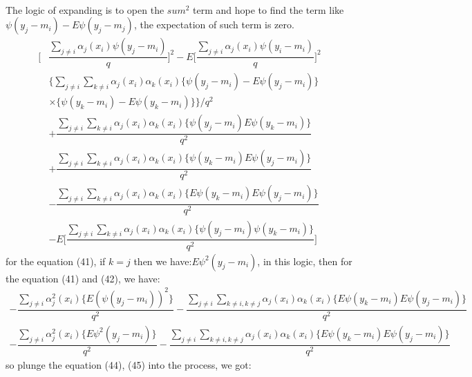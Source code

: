 \documentclass[12pt]{amsart}
\begin{document}
\\
The logic of expanding is to open the $sum^2$ term and hope to find the term like $\psi(y_{j}-m_{i})-E\psi(y_{j}-m_{j})$, the expectation of such term is zero.
\begin{align}
\bigg[&\dfrac{\sum_{j\neq i}\alpha_{j}(x_{i})\psi(y_{j}-m_{i})}{q}\bigg]^{2}-E\bigg[\dfrac{\sum_{j\neq i}\alpha_{j}(x_{i})\psi(y_{i}-m_{i})}{q}\bigg]^{2}\nonumber\\
&\bigg \{\sum_{j\neq i} \sum_{k\neq i}\alpha_{j}(x_{i})\alpha_{k}(x_{i})\{\psi(y_{j}-m_{i})-E\psi(y_{j}-m_{i})\}\nonumber\\
&\times\{\psi(y_{k}-m_{i})-E\psi(y_{k}-m_{i})\}\bigg \}\bigg/q^{2}\\
&+\dfrac{\sum_{j\neq i} \sum_{k\neq i}\alpha_{j}(x_{i})\alpha_{k}(x_{i})\{\psi(y_{j}-m_{i})E\psi(y_{k}-m_{i})\}}{q^2}\nonumber\\
&+\dfrac{\sum_{j\neq i} \sum_{k\neq i}\alpha_{j}(x_{i})\alpha_{k}(x_{i})\{\psi(y_{k}-m_{i})E\psi(y_{j}-m_{i})\}}{q^2}\nonumber\\
&-\dfrac{\sum_{j\neq i} \sum_{k\neq i}\alpha_{j}(x_{i})\alpha_{k}(x_{i})\{E\psi(y_{k}-m_{i})E\psi(y_{j}-m_{i})\}}{q^2}\nonumber\\
&-E\bigg[\dfrac{\sum_{j\neq i} \sum_{k\neq i}\alpha_{j}(x_{i})\alpha_{k}(x_{i})\{\psi(y_{j}-m_{i}) \psi(y_{k}-m_{i})\}}{q^2}\bigg]
\end{align}
for the equation (41), if $k=j$ then we have:$E\psi^{2}(y_{j}-m_{i})$, in this logic, then for the equation (41) and (42), we have:
\begin{align}
-\dfrac{\sum_{j\neq i} \alpha^{2}_{j}(x_{i})\{E(\psi(y_{j}-m_{i}))^{2}\}}{q^2}-\dfrac{\sum_{j\neq i} \sum_{k\neq i,k\neq j}\alpha_{j}(x_{i})\alpha_{k}(x_{i})\{E\psi(y_{k}-m_{i})E\psi(y_{j}-m_{i})\}}{q^2}\nonumber\\
-\dfrac{\sum_{j\neq i} \alpha^{2}_{j}(x_{i})\{E\psi^{2}(y_{j}-m_{i})\}}{q^2}-\dfrac{\sum_{j\neq i} \sum_{k\neq i,k\neq j}\alpha_{j}(x_{i})\alpha_{k}(x_{i})\{E\psi(y_{k}-m_{i})E\psi(y_{j}-m_{i})\}}{q^2}\nonumber
\end{align}
so plunge the equation (44), (45) into the process, we got:
\end{document}
